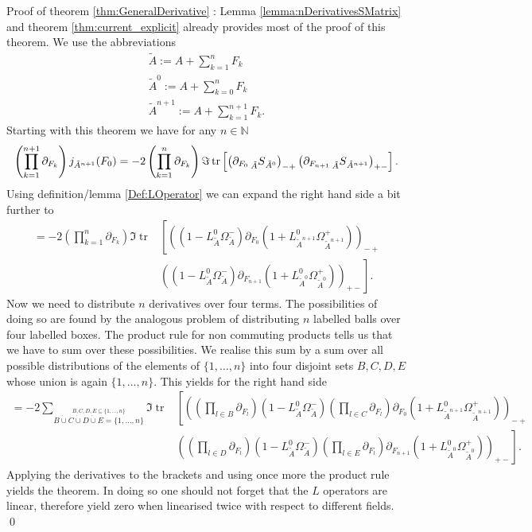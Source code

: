 \documentclass[oneside,reqno,12pt]{amsart}
\DeclareMathOperator{\tr}{tr}
\begin{document}
Proof of theorem \ref{thm:GeneralDerivative} 
: Lemma \ref{lemma:nDerivativesSMatrix} and theorem 
\ref{thm:current_explicit} already provides most of the proof of this theorem. We use the abbreviations
\begin{align*}
\tilde{A}:= A+\sum_{k=1}^{n}F_k\\
\tilde{A}^0:= A+\sum_{k=0}^{n}F_k\\
\tilde{A}^{n+1}:= A+\sum_{k=1}^{n+1}F_k.
\end{align*}
 Starting with this theorem we have for any \(n\in\mathbb{N}\)
\begin{equation}
\left(\prod_{k=1}^{n+1} \partial_{F_k}\right) j_{\tilde{A}^{n+1}}(F_0) 
=-2\left(\prod_{k=1}^{n} \partial_{F_k}\right)  \Im \tr\left[ \left( \partial_{F_0} \prescript{}{\tilde{A}}{S}_{\tilde{A}^{0}}\right)_{-+} 
\left( \partial_{F_{n+1}} \prescript{}{\tilde{A}}{S}_{\tilde{A}^{n+1}}\right)_{+-}\right].
\end{equation}
Using definition/lemma \ref{Def:LOperator} we can expand the right hand side a bit further to 
\begin{align*}
=-2\left(\prod_{k=1}^{n} \partial_{F_k}\right)  \Im \tr&\left[ 
\left( \left(1-L^0_{\tilde{A}}\Omega^-_{\tilde{A}} \right)  \partial_{F_0}\left(1+ L^0_{\tilde{A}^{n+1}} \Omega^+_{\tilde{A}^{n+1}}\right)\right)_{-+}\right. \\
&\left.\left( \left(1-L^0_{\tilde{A}}\Omega^-_{\tilde{A}} \right)  \partial_{F_{n+1}}\left(1+ L^0_{\tilde{A}^{0}} \Omega^+_{\tilde{A}^0}\right)\right)_{+-}
\right].
\end{align*}
Now we need to distribute \(n\) derivatives over four terms. The possibilities of doing so are found by the analogous problem of distributing \(n\) 
labelled balls over four labelled boxes. The product rule for non commuting products tells us that we have to sum over these possibilities. 
We realise this sum by a sum over all possible distributions of the elements of \(\{1,\dots, n\}\) into four disjoint sets \(B,C,D,E\) whose union is again \(\{1,\dots, n\}\). This yields for the right hand side
\begin{align*}
=-2\sum_{\stackrel{B,C,D,E\subseteq \{1,\dots, n\}}{B\dot{\cup}C\dot{\cup}D\dot{\cup}E=\{1,\dots, n\}}}  \Im \tr&\left[ 
\left( \left(\prod_{l\in B} \partial_{F_l}\right)\left(1-L^0_{\tilde{A}}\Omega^-_{\tilde{A}} \right) 
\left(\prod_{l\in C} \partial_{F_l}\right) \partial_{F_0}\left(1+ L^0_{\tilde{A}^{n+1}} \Omega^+_{\tilde{A}^{n+1}}\right)\right)_{-+}\right. \\
&\left.\left( \left(\prod_{l\in D} \partial_{F_l}\right)\left(1-L^0_{\tilde{A}}\Omega^-_{\tilde{A}} \right) 
\left(\prod_{l\in E} \partial_{F_l}\right) \partial_{F_{n+1}}\left(1+ L^0_{\tilde{A}^{0}} \Omega^+_{\tilde{A}^0}\right)\right)_{+-}
\right].
\end{align*}
Applying the derivatives to the brackets and using once more the product rule yields the theorem. In doing so one should not forget that the \(L\) operators are linear, therefore yield zero when linearised twice with respect to different fields. \qed
\end{document}
